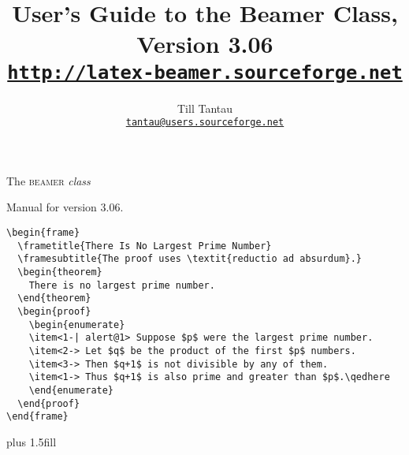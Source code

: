 \documentclass{ltxdoc}
\def\version{3.06}
\begin{document}
{
  \parindent0pt
\vbox{}
\vskip 3.5cm
\Huge
The \textsc{beamer} \textit{class}

\Large
Manual for version \version.
\vskip 3cm

\normalsize
\begin{verbatim}
\begin{frame}
  \frametitle{There Is No Largest Prime Number}
  \framesubtitle{The proof uses \textit{reductio ad absurdum}.}
  \begin{theorem}
    There is no largest prime number.
  \end{theorem}
  \begin{proof}
    \begin{enumerate}
    \item<1-| alert@1> Suppose $p$ were the largest prime number.
    \item<2-> Let $q$ be the product of the first $p$ numbers.
    \item<3-> Then $q+1$ is not divisible by any of them.
    \item<1-> Thus $q+1$ is also prime and greater than $p$.\qedhere
    \end{enumerate}      
  \end{proof}
\end{frame}
\end{verbatim}
\qquad{}
\vskip 0cm plus 1.5fill
\vbox{}         
\clearpage
}


\title{User's Guide to the Beamer Class, Version \version\\
\Large\href{http://latex-beamer.sourceforge.net}{\texttt{http://latex-beamer.sourceforge.net}}}
\author{Till Tantau\\
  \href{mailto:tantau@users.sourceforge.net}{\texttt{tantau@users.sourceforge.net}}}

\maketitle

\tableofcontents



\end{document}

